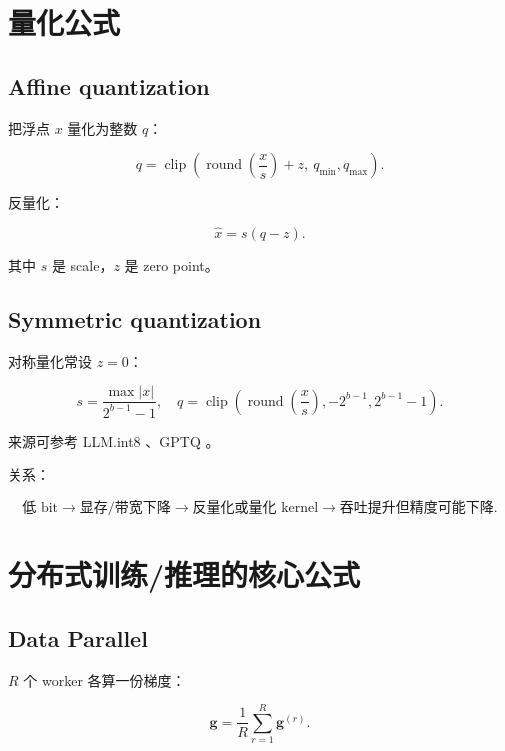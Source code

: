 \documentclass[UTF8,12pt]{ctexart}
\newcommand{\1}{\mathbf{1}}
\newcommand{\clip}{\operatorname{clip}}
\begin{document}
\section{量化公式}

\subsection{Affine quantization}

把浮点 $x$ 量化为整数 $q$：

\begin{equation}
q=\clip\left(\operatorname{round}\left(\frac{x}{s}\right)+z,\ q_{\min},q_{\max}\right).
\end{equation}

反量化：

\begin{equation}
\hat{x}=s(q-z).
\end{equation}

其中 $s$ 是 scale，$z$ 是 zero point。

\subsection{Symmetric quantization}

对称量化常设 $z=0$：

\begin{equation}
s=\frac{\max |x|}{2^{b-1}-1},
\quad
q=\clip\left(\operatorname{round}\left(\frac{x}{s}\right),
-2^{b-1},2^{b-1}-1\right).
\end{equation}

来源可参考 LLM.int8 \cite{dettmers2022llmint8}、GPTQ \cite{frantar2022gptq}。

关系：

\[
\text{低 bit}
\rightarrow
\text{显存/带宽下降}
\rightarrow
\text{反量化或量化 kernel}
\rightarrow
\text{吞吐提升但精度可能下降}.
\]

\section{分布式训练/推理的核心公式}

\subsection{Data Parallel}

$R$ 个 worker 各算一份梯度：

\begin{equation}
\bm{g}
=\frac{1}{R}\sum_{r=1}^{R}\bm{g}^{(r)}.
\end{equation}
\end{document}
